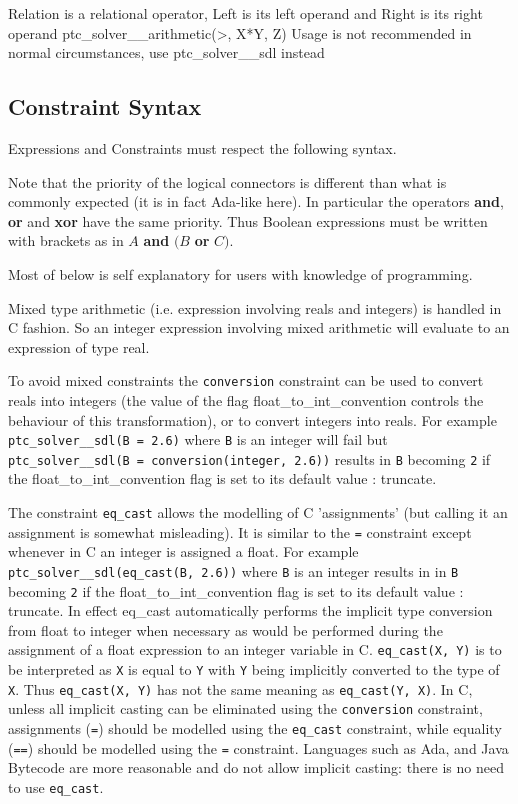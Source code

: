 \documentclass{article}
\begin{document}
        {Relation is a relational operator, Left is its left operand and Right is
its right operand}
        {ptc\_solver\_\_arithmetic(>, X*Y, Z)}
        {Usage is not recommended in normal circumstances, use ptc\_solver\_\_sdl
instead}


\subsection{Constraint Syntax}

Expressions and Constraints must respect the following syntax.

Note that the priority of the logical connectors is different than  what is
commonly expected (it is in fact Ada-like here). In particular the operators
\textbf{and}, \textbf{or} and \textbf{xor} have the same
priority. Thus Boolean expressions must be written with brackets as in $A$
\textbf{and} $(B$ \textbf{or} $C)$.

Most of below is self explanatory for users with knowledge of programming.

Mixed type arithmetic (i.e. expression involving reals and integers) is handled in
C fashion. So an integer expression involving mixed arithmetic will evaluate to
an expression of type real.

To avoid mixed constraints the \texttt{conversion} constraint can be used to
convert reals into integers (the value of the flag float\_to\_int\_convention
controls the behaviour of this transformation), or to convert integers into
reals. For example \texttt{ptc\_solver\_\_sdl(B = 2.6)} where \texttt{B} is an
integer will fail but \texttt{ptc\_solver\_\_sdl(B = conversion(integer, 2.6))}
results in \texttt{B} becoming \texttt{2} if the float\_to\_int\_convention flag
is set to its default value : truncate.

The constraint \texttt{eq\_cast} allows the modelling of C 'assignments' (but calling it an assignment is somewhat misleading). It is
similar to the \texttt{=} constraint except whenever in C an integer is assigned
a float. For example \texttt{ptc\_solver\_\_sdl(eq\_cast(B, 2.6))} where
\texttt{B} is an integer results in in \texttt{B} becoming \texttt{2} if the
float\_to\_int\_convention flag is set to its default value : truncate. In effect
eq\_cast automatically performs the implicit type conversion from float to
integer when necessary as would be performed during the assignment of a float
expression to an integer variable in C. \texttt{eq\_cast(X, Y)} is to be
interpreted as \texttt{X} is equal to \texttt{Y} with \texttt{Y} being implicitly
converted to the type of \texttt{X}. Thus \texttt{eq\_cast(X, Y)} has not the
same meaning as \texttt{eq\_cast(Y, X)}. In C, unless all implicit casting can be
eliminated using the \texttt{conversion} constraint, assignments (\texttt{=})
should be modelled using the \texttt{eq\_cast} constraint, while equality
(\texttt{==}) should be modelled using the \texttt{=} constraint. Languages such
as Ada, and Java Bytecode are more reasonable and do not allow implicit casting:
there is no need to use \texttt{eq\_cast}.
\end{document}
